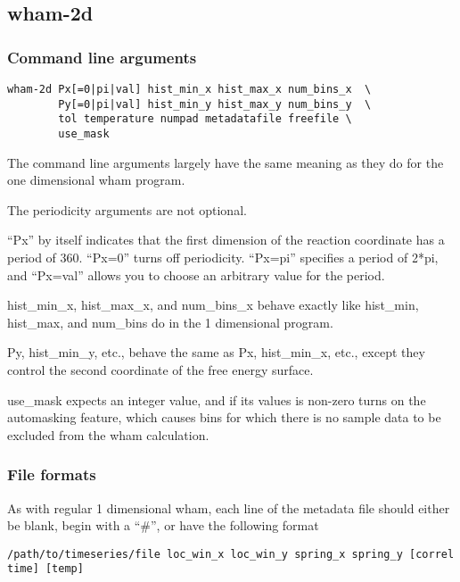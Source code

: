 \documentclass[12pt]{article}
\begin{document}
\subsection{wham-2d}

\subsubsection{Command line arguments}

\begin{verbatim}
wham-2d Px[=0|pi|val] hist_min_x hist_max_x num_bins_x  \
        Py[=0|pi|val] hist_min_y hist_max_y num_bins_y  \
        tol temperature numpad metadatafile freefile \
        use_mask
\end{verbatim}

The command line arguments largely have the same meaning as they do for the
one dimensional wham program.

The periodicity arguments are not optional.

``Px'' by itself indicates that the first dimension of the reaction coordinate
has a period of 360.  ``Px=0'' turns off periodicity.  ``Px=pi'' specifies a
period of 2*pi, and ``Px=val'' allows you to choose an arbitrary value for
the period.

hist\_min\_x, hist\_max\_x, and num\_bins\_x behave exactly like hist\_min,
hist\_max, and num\_bins do in the 1 dimensional program.

Py, hist\_min\_y, etc., behave the same as Px, hist\_min\_x, etc., except they
control the second coordinate of the free energy surface.

use\_mask expects an integer value, and if its values is non-zero turns on
the automasking feature, which causes bins for which there is no sample data
to be excluded from the wham calculation.

\subsubsection{File formats}

As with regular 1 dimensional wham, each line of the metadata file should
either be blank, begin with a ``\#'', or have the following format

\begin{footnotesize}
\begin{verbatim}
/path/to/timeseries/file loc_win_x loc_win_y spring_x spring_y [correl time] [temp]
\end{verbatim}
\end{footnotesize}
\end{document}
